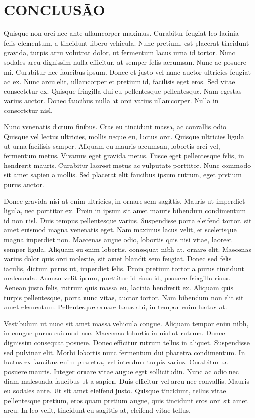 \chapter{CONCLUSÃO}
\label{cap:consideracoes}

Quisque non orci nec ante ullamcorper maximus. Curabitur feugiat leo lacinia felis elementum, a tincidunt libero vehicula. Nunc pretium, est placerat tincidunt gravida, turpis arcu volutpat dolor, ut fermentum lacus urna id tortor. Nunc sodales arcu dignissim nulla efficitur, at semper felis accumsan. Nunc ac posuere mi. Curabitur nec faucibus ipsum. Donec et justo vel nunc auctor ultricies feugiat ac ex. Nunc arcu elit, ullamcorper et pretium id, facilisis eget eros. Sed vitae consectetur ex. Quisque fringilla dui eu pellentesque pellentesque. Nam egestas varius auctor. Donec faucibus nulla at orci varius ullamcorper. Nulla in consectetur nisl.

Nunc venenatis dictum finibus. Cras eu tincidunt massa, ac convallis odio. Quisque vel lectus ultricies, mollis neque eu, luctus orci. Quisque ultricies ligula ut urna facilisis semper. Aliquam eu mauris accumsan, lobortis orci vel, fermentum metus. Vivamus eget gravida metus. Fusce eget pellentesque felis, in hendrerit mauris. Curabitur laoreet metus ac vulputate porttitor. Nunc commodo sit amet sapien a mollis. Sed placerat elit faucibus ipsum rutrum, eget pretium purus auctor.

Donec gravida nisi at enim ultricies, in ornare sem sagittis. Mauris ut imperdiet ligula, nec porttitor ex. Proin in ipsum sit amet mauris bibendum condimentum id non nisl. Duis tempus pellentesque varius. Suspendisse porta eleifend tortor, sit amet euismod magna venenatis eget. Nam maximus lacus velit, et scelerisque magna imperdiet non. Maecenas augue odio, lobortis quis nisi vitae, laoreet semper ligula. Aliquam eu enim lobortis, consequat nibh at, ornare elit. Maecenas varius dolor quis orci molestie, sit amet blandit sem feugiat. Donec sed felis iaculis, dictum purus ut, imperdiet felis. Proin pretium tortor a purus tincidunt malesuada. Aenean velit ipsum, porttitor id risus id, posuere fringilla risus. Aenean justo felis, rutrum quis massa eu, lacinia hendrerit ex. Aliquam quis turpis pellentesque, porta nunc vitae, auctor tortor. Nam bibendum non elit sit amet elementum. Pellentesque ornare lacus dui, in tempor enim luctus at.

Vestibulum ut nunc sit amet massa vehicula congue. Aliquam tempor enim nibh, in congue purus euismod nec. Maecenas lobortis in nisl at rutrum. Donec dignissim consequat posuere. Donec efficitur rutrum tellus in aliquet. Suspendisse sed pulvinar elit. Morbi lobortis nunc fermentum dui pharetra condimentum. In luctus ex faucibus enim pharetra, vel interdum turpis varius. Curabitur ac posuere mauris. Integer ornare vitae augue eget sollicitudin. Nunc ac odio nec diam malesuada faucibus ut a sapien. Duis efficitur vel arcu nec convallis. Mauris eu sodales ante. Ut sit amet eleifend justo. Quisque tincidunt, tellus vitae pellentesque pretium, eros quam pretium augue, quis tincidunt eros orci sit amet arcu. In leo velit, tincidunt eu sagittis at, eleifend vitae tellus.

